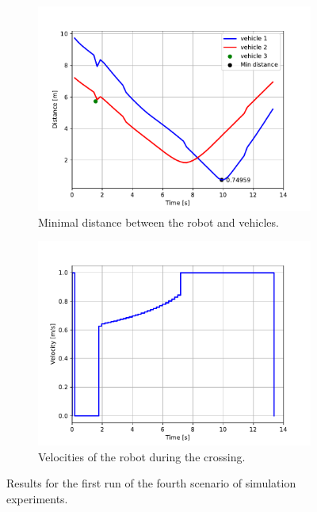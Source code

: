             \begin{figure}[H]
                \centering
                \begin{subfigure}{0.49\linewidth}
                    \centering
                    \includegraphics[trim={24 8 40 41}, clip, width=\linewidth]{images/simulations/scene4_1_dist.pdf}
                    \caption{Minimal distance between the robot and vehicles.}
                \end{subfigure}
                \begin{subfigure}{0.49\linewidth}
                    \centering
                    \includegraphics[trim={21 8 40 41}, clip, width=\linewidth]{images/simulations/scene4_1_vel.pdf}
                    \caption{Velocities of the robot during the crossing.}
                \end{subfigure}
                \caption{Results for the first run of the fourth scenario of simulation experiments.}
                \label{fig:scene4_1_graphs}
            \end{figure}
